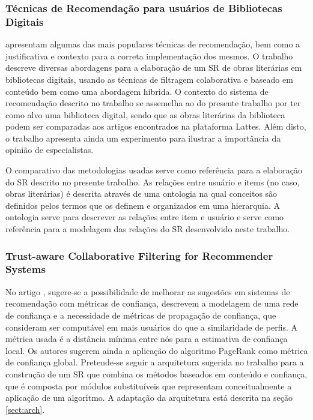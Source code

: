 \documentclass[12pt]{article}
\begin{document}
\subsubsection{Técnicas de Recomendação para usuários de Bibliotecas
Digitais}

\cite{primo2006tecnicas} apresentam algumas das mais populares técnicas de recomendação, bem como a justificativa e contexto para a 
correta implementação dos mesmos. O trabalho descreve diversas abordagens para a elaboração de um SR de obras literárias 
em bibliotecas digitais, usando as técnicas de filtragem colaborativa e baseado em conteúdo bem como uma abordagem híbrida. 
O contexto do sistema de recomendação descrito no trabalho se assemelha ao do presente trabalho por ter como alvo uma 
biblioteca digital, sendo que as obras literárias da biblioteca podem ser comparadas aos artigos encontrados na plataforma 
Lattes. Além disto, o trabalho apresenta ainda um experimento para ilustrar a importância da opinião de especialistas.

O comparativo das metodologias usadas serve como referência para a elaboração do SR descrito no presente trabalho. 
As relações entre usuário e items (no caso, obras literárias) é descrita através de uma ontologia na qual conceitos são 
definidos pelos termos que os definem e organizados em uma hierarquia. A ontologia serve para descrever as relações entre 
item e usuário e serve como referência para a modelagem das relações do SR desenvolvido neste trabalho.

\subsubsection{Trust-aware Collaborative Filtering for Recommender Systems}

No artigo \cite{massa2004trust}, sugere-se a possibilidade de melhorar as sugestões em sistemas de recomendação com métricas de confiança, descrevem a modelagem de uma rede de confiança e a necessidade de métricas de propagação de confiança, que consideram ser computável em 
mais usuários do que a similaridade de perfis. A métrica usada é a distância mínima entre nós para a estimativa de 
confiança local. Os autores sugerem ainda a aplicação do algoritmo PageRank \cite{page1999pagerank} como métrica de confiança global. Pretende-se seguir a arquitetura sugerida no trabalho para a construção de um SR que combina os métodos baseados em 
conteúdo e confiança, que é composta por módulos substituíveis que representam conceitualmente a aplicação de um algoritmo. A adaptação da arquitetura está descrita na seção \ref{sect:arch}.
\end{document}
